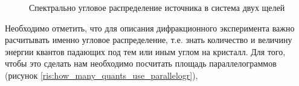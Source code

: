 \begin{figure}[H]
  \centering
  \hfill
  \caption{Спектрально угловое распределение источника в система двух щелей}
  \label{ris:sourc_map}
\end{figure}

Необходимо отметить, что для описания дифракционного эксперимента важно расчитывать именно
угловое распределение, т.е. знать количество и величину энергии квантов падающих под тем
или иным углом на кристалл. Для того, чтобы это сделать нам необходимо посчитать площадь параллелограммов
(рисунок \ref{ris:how_many_quants_use_parallelogr}),

